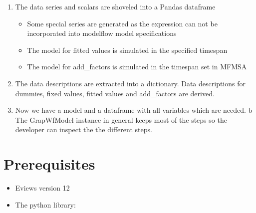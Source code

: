\documentclass[letterpaper,10pt,english]{jupyterBook}
\begin{document}
\begin{enumerate}
\item {} 
\sphinxAtStartPar
The data series and scalars are shoveled into a Pandas dataframe
\begin{itemize}
\item {} 
\sphinxAtStartPar
Some special series are generated as the expression can not be incorporated into modelflow model specifications

\item {} 
\sphinxAtStartPar
The model for fitted values is simulated in the specified timespan

\item {} 
\sphinxAtStartPar
The model for add\_factors is simulated in the timespan set in MFMSA

\end{itemize}

\item {} 
\sphinxAtStartPar
The data descriptions are extracted into a dictionary.
\sphinxhyphen{} Data descriptions for dummies, fixed values, fitted values and add\_factors are derived.

\item {} 
\sphinxAtStartPar
Now we have a model and a dataframe with all variables which are needed.
b
The GrapWfModel instance in general keeps most of the steps so the developer can inspect the the different steps.

\end{enumerate}


\section{Prerequisites}
\label{\detokenize{content/howto/onboard/eviews/onboard one model from  wf1:prerequisites}}\begin{itemize}
\item {} 
\sphinxAtStartPar
Eviews version 12

\item {} 
\sphinxAtStartPar
The python library: 

\end{itemize}
\end{document}
